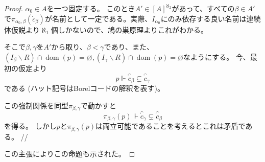 \documentclass[uplatex,dvipdfmx]{jsarticle}
\newcommand{\dom}{\operatorname{dom}}
\newcommand\forces{\Vdash}
\renewcommand\emptyset{\varnothing}
\renewcommand{\setminus}{\smallsetminus}
\theoremstyle{definition}
\begin{document}
\begin{proof}
		$\alpha_0 \in A$を一つ固定する。
		このとき$A' \in [A]^{\aleph_2}$があって、すべての$\beta \in A'$で$\pi_{\alpha_0,\beta}(\dot{c}_\beta)$が名前として一定である。実際、$I_{\alpha_0}$にのみ依存する良い名前は連続体仮説より$\aleph_1$個しかないので、鳩の巣原理よりこれがわかる。
		
		そこで$\beta, \gamma$を$A'$から取り、$\beta < \gamma$であり、また、$(I_\beta \setminus R) \cap \dom(p) = \emptyset, (I_\gamma \setminus R) \cap \dom(p) = \emptyset$なようにする。
		今、最初の仮定より
		\[
		p \forces \hat{\dot{c}}_\beta \subsetneq \hat{\dot{c}}_\gamma
		\]
		である (ハット記号はBorelコードの解釈を表す)。
		
		この強制関係を同型$\pi_{\beta,\gamma}$で動かすと
		\[
		\pi_{\beta,\gamma}(p) \forces \hat{\dot{c}}_\gamma \subsetneq \hat{\dot{c}}_\beta
		\]
		を得る。
		しかし$p$と$\pi_{\beta,\gamma}(p)$は両立可能であることを考えるとこれは矛盾である。 \hfill //
		
		この主張によりこの命題も示された。
	\end{proof}
	
	\nocite{*}
	\printbibliography[title={参考文献}]
\end{document}
